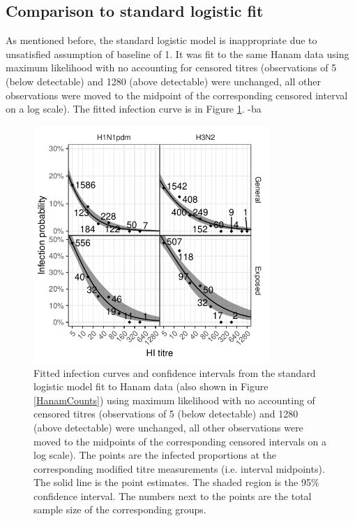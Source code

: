 \documentclass[12pt]{article}
\begin{document}
\pagebreak
%
\subsection{Comparison to standard logistic fit}

As mentioned before, the standard logistic model is inappropriate due to unsatisfied assumption of baseline of 1. It was fit to the same Hanam data using maximum likelihood with no accounting for censored titres (observations of 5 (below detectable) and 1280 (above detectable) were unchanged, all other observations were moved to the midpoint of the corresponding censored interval on a log scale). The fitted infection curve is in Figure \ref{lr-inf}.
-ba
\begin{figure}[htp]
	\centering
	\includegraphics[width=0.8\textwidth]{../fit-logistic-plot/hanam-hi-inf.pdf}
	\caption{
	Fitted infection curves and confidence intervals from the standard logistic model fit to Hanam data (also shown in Figure \ref{HanamCounts}) using maximum likelihood with no accounting of censored titres (observations of 5 (below detectable) and 1280 (above detectable) were unchanged, all other observations were moved to the midpoints of the corresponding censored intervals on a log scale). The points are the infected proportions at the corresponding modified titre measurements (i.e. interval midpoints). The solid line is the point estimates. The shaded region is the 95\% confidence interval. The numbers next to the points are the total sample size of the corresponding groups.
	}
	\label{lr-inf}
\end{figure}
\end{document}

